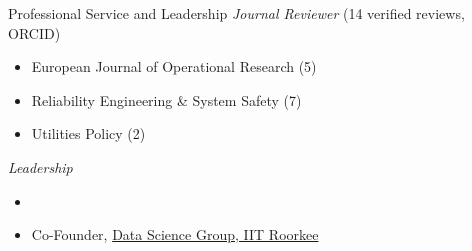 \begin{rSection}{Professional Service and Leadership}
\textit{Journal Reviewer} (14 verified reviews, ORCID)
\begin{itemize}
    \item European Journal of Operational Research (5)
    \item Reliability Engineering \& System Safety (7)
    \item Utilities Policy (2)
\end{itemize}
\smallskip
\textit{Leadership}
\begin{itemize}
    \item {}
    \item Co-Founder, \href{https://dsgiitr.in}{Data Science Group, IIT Roorkee}
\end{itemize}
\end{rSection}
